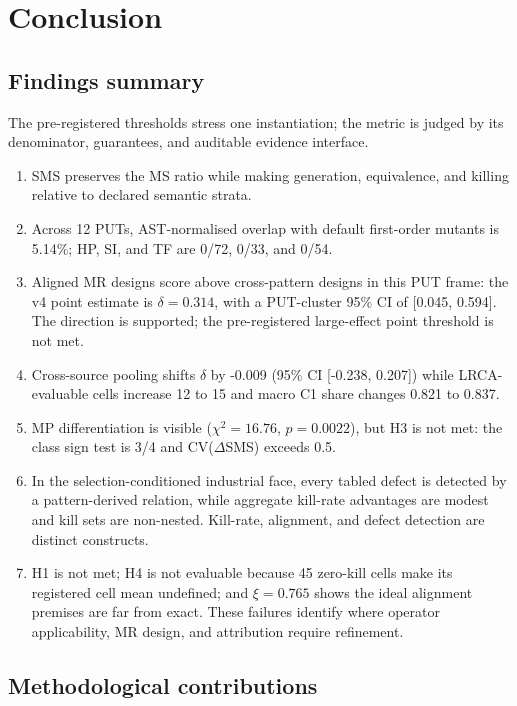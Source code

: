 \documentclass[manuscript,screen,review]{acmart}
\begin{document}


\section{Conclusion}\label{conclusion}

\subsection{Findings summary}\label{findings-summary}

The pre-registered thresholds stress one instantiation; the metric is
judged by its denominator, guarantees, and auditable evidence interface.

\begin{enumerate}
\item
  SMS preserves the MS ratio while making generation, equivalence, and
  killing relative to declared semantic strata.
\item
  Across 12 PUTs, AST-normalised overlap with default first-order
  mutants is 5.14\%; HP, SI, and TF are 0/72, 0/33, and 0/54.
\item
  Aligned MR designs score above cross-pattern designs in this PUT
  frame: the v4 point estimate is \(\delta=0.314\), with a
  PUT-cluster 95\% CI of [0.045, 0.594]. The direction is supported;
  the pre-registered large-effect point threshold is not met.
\item
  Cross-source pooling shifts \(\delta\) by -0.009 (95\% CI
  [-0.238, 0.207]) while LRCA-evaluable cells increase 12 to 15 and
  macro C1 share changes 0.821 to 0.837.
\item
  MP differentiation is visible (\(\chi^2=16.76\), \(p=0.0022\)), but
  H3 is not met: the class sign test is 3/4 and
  CV(\(\Delta\)SMS) exceeds 0.5.
\item
  In the selection-conditioned industrial face, every tabled defect is
  detected by a pattern-derived relation, while aggregate kill-rate
  advantages are modest and kill sets are non-nested. Kill-rate,
  alignment, and defect detection are distinct constructs.
\item
  H1 is not met; H4 is not evaluable because 45 zero-kill cells make
  its registered cell mean undefined; and \(\xi=0.765\) shows the ideal
  alignment premises are far from exact. These failures identify where
  operator applicability, MR design, and attribution require refinement.
\end{enumerate}

\subsection{Methodological contributions}\label{methodological-contributions}
\end{document}
